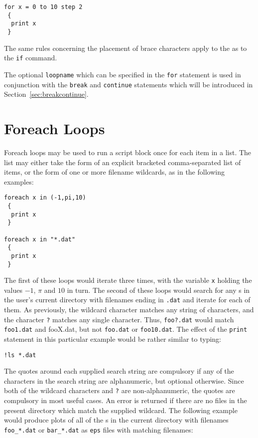 \begin{verbatim}
for x = 0 to 10 step 2
 {
  print x
 }
\end{verbatim}

\noindent The same rules concerning the placement of brace characters apply to
the  as to the {\tt if} command.

The optional {\tt loopname} which can be specified in the {\tt for} statement
is used in conjunction with the {\tt break} and {\tt continue} statements which
will be introduced in Section~\ref{sec:breakcontinue}.

\section{Foreach Loops}

Foreach loops may be used to run a script block once for each item in a list.
The list may either take the form of an explicit bracketed comma-separated list
of items, or the form of one or more filename wildcards, as in the following
examples:

\begin{verbatim}
foreach x in (-1,pi,10)
 {
  print x
 }

foreach x in "*.dat"
 {
  print x
 }
\end{verbatim}

The first of these loops would iterate three times, with the variable {\tt x}
holding the values $-1$, $\pi$ and $10$ in turn. The second of these loops
would search for any \datafile s in the user's current directory with filenames
ending in {\tt .dat} and iterate for each of them. As previously, the wildcard
character {\tt *} matches any string of characters, and the character {\tt ?}
matches any single character. Thus, {\tt foo?.dat} would match {\tt foo1.dat}
and {fooX.dat}, but not {\tt foo.dat} or {\tt foo10.dat}. The effect of the
{\tt print} statement in this particular example would be rather similar to
typing:

\begin{verbatim}
!ls *.dat
\end{verbatim}

The quotes around each supplied search string are compulsory if any of the
characters in the search string are alphanumeric, but optional otherwise. Since
both of the wildcard characters {\tt *} and {\tt ?} are non-alphanumeric, the
quotes are compulsory in most useful cases.  An error is returned if there are
no files in the present directory which match the supplied wildcard. The
following example would produce plots of all of the \datafile s in the current
directory with filenames {\tt foo\_*.dat} or {\tt bar\_*.dat} as {\tt eps}
files with matching filenames:

